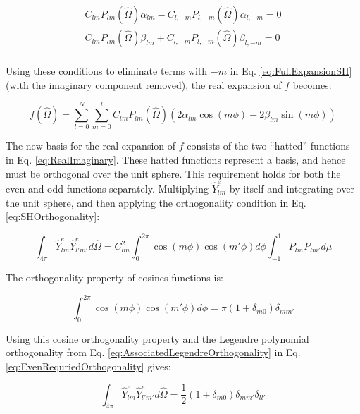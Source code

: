 \documentclass[10pt]{article}
\begin{document}
\begin{flushleft}
\begin{tcolorbox}[breakable]
\begin{equation}
\begin{aligned}
C_{lm}P_{lm}(\hat{\Omega})\alpha_{lm}-C_{l,-m}P_{l,-m}(\hat{\Omega})\alpha_{l,-m}=0\\
C_{lm}P_{lm}(\hat{\Omega})\beta_{lm}+C_{l,-m}P_{l,-m}(\hat{\Omega})\beta_{l,-m}=0\\
\end{aligned}
\end{equation}

Using these conditions to eliminate terms with \(-m\) in Eq. \eqref{eq:FullExpansionSH} (with the imaginary component removed), the real expansion of \(f\) becomes:

\begin{equation}
\label{eq:FullExpansionSH2}
f(\hat{\Omega})=\sum_{l=0}^{N}\sum_{m=0}^{l}C_{lm}P_{lm}(\hat{\Omega})\left(2\alpha_{lm}\cos{(m\phi)}-2\beta_{lm}\sin{(m\phi)}\right)
\end{equation}

The new basis for the real expansion of \(f\) consists of the two ``hatted'' functions in Eq. \eqref{eq:RealImaginary}. These hatted functions represent a basis, and hence must be orthogonal over the unit sphere. This requirement holds for both the even and odd functions separately. Multiplying \(\hat{Y}_{lm}^e\) by itself and integrating over the unit sphere, and then applying the orthogonality condition in Eq. \eqref{eq:SHOrthogonality}:

\begin{equation}
\label{eq:EvenRequriedOrthogonality}
\int_{4\pi}^{}\hat{Y}_{lm}^e\hat{Y}_{l'm'}^ed\hat{\Omega}=C_{lm}^2\int_{0}^{2\pi}\cos{(m\phi)}\cos{(m'\phi)}d\phi\int_{-1}^{1}P_{lm}P_{lm'}d\mu
\end{equation}

The orthogonality property of cosines functions is:

\begin{equation}
\int_{0}^{2\pi}\cos{(m\phi)}\cos{(m'\phi)}d\phi=\pi(1+\delta_{m0})\delta_{mm'}
\end{equation}

Using this cosine orthogonality property and the Legendre polynomial orthogonality from Eq. \eqref{eq:AssociatedLegendreOrthogonality} in Eq. \eqref{eq:EvenRequriedOrthogonality} gives:

\begin{equation}
\label{eq:EvenRequriedOrthogonality2}
\int_{4\pi}^{}\hat{Y}_{lm}^e\hat{Y}_{l'm'}^ed\hat{\Omega}=\frac{1}{2}(1+\delta_{m0})\delta_{mm'}\delta_{ll'}
\end{equation}


\end{tcolorbox}
\end{flushleft}
\end{document}
